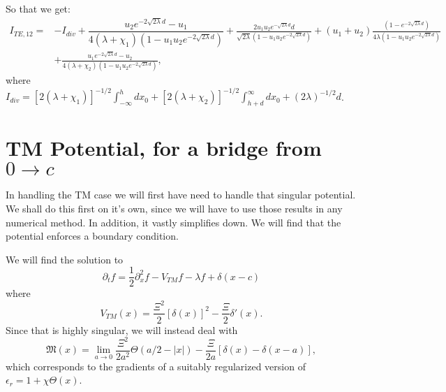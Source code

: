 
So that we get:
\begin{align}
I_{TE,12} =& -I_{div} + \dfrac{u_2 e^{-2\sqrt{2\lambda}d}-u_1}{4(\lambda+\chi_1)(1-u_1u_2 e^{-2\sqrt{2\lambda}d})} +\frac{2u_1u_2 e^{-\sqrt{2\lambda}d}d}{\sqrt{2\lambda}(1-u_1u_2 e^{-2\sqrt{2\lambda}d})} + (u_1+u_2)\frac{(1-e^{-2\sqrt{2\lambda}d})}{4\lambda(1-u_1u_2e^{-2\sqrt{2\lambda}d})}\nonumber\\
& +\frac{u_1 e^{-2\sqrt{2\lambda}d} - u_2}{4(\lambda+\chi_2)(1-u_1u_2 e^{-2\sqrt{2\lambda}d})},
\end{align}
where $I_{div} = [2(\lambda+\chi_1)]^{-1/2}\int_{-\infty}^h dx_0  +  [2(\lambda+\chi_2)]^{-1/2}\int_{h+d}^\infty dx_0  + (2\lambda)^{-1/2}d$.


\section{TM Potential, for a bridge from $0\rightarrow c$}

In handling the TM case we will first have need to handle that singular potential.  We shall do this first on it's own, since we will have to use those results in any numerical method.  In addition, it vastly simplifies down.  We will find that the potential enforces a boundary condition.  

We will find the solution to 
\begin{equation}
\partial_t f = \frac{1}{2}\partial_x^2f -V_{TM} f - \lambda f + \delta(x-c)
\end{equation}
where 
\begin{equation}
V_{TM}(x) = \frac{\Xi^2}{2}[\delta(x)]^2 - \frac{\Xi}{2}\delta'(x).
\end{equation}
Since that is highly singular, we will instead deal with 
\begin{equation}
\mathfrak{M}(x) = \lim_{a\rightarrow 0} \frac{\Xi^2}{2a^2}\Theta(a/2-|x|) - \frac{\Xi}{2a}[\delta(x)-\delta(x-a)],
\end{equation}
which corresponds to the gradients of a suitably regularized version of $\epsilon_r = 1+\chi\Theta(x)$.  

